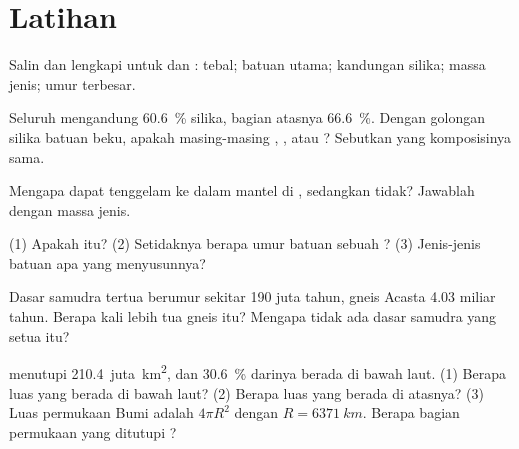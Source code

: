 \section{Latihan}

\begin{exercise}[$\star$]\label{exo:g12:continental-crust:1}
Salin dan lengkapi untuk  dan : tebal; batuan utama;
kandungan silika; massa jenis; umur terbesar.
\end{exercise}

\begin{exercise}[$\star$]\label{exo:g12:continental-crust:2}
Seluruh  mengandung \qty{60.6}{\percent} silika, bagian atasnya
\qty{66.6}{\percent}. Dengan golongan silika batuan beku, apakah masing-masing
, , atau ? Sebutkan  yang komposisinya
sama.
\end{exercise}

\begin{exercise}[$\star$]\label{exo:g12:continental-crust:3}
Mengapa  dapat tenggelam ke dalam mantel di ,
sedangkan  tidak? Jawablah dengan massa jenis.
\end{exercise}

\begin{exercise}[$\star$]\label{exo:g12:continental-crust:4}
(1) Apakah  itu? (2) Setidaknya berapa umur batuan sebuah ?
(3) Jenis-jenis batuan apa yang menyusunnya?
\end{exercise}

\begin{exercise}[$\star$]\label{exo:g12:continental-crust:5}
Dasar samudra tertua berumur sekitar 190 juta tahun, gneis Acasta 4.03 miliar
tahun. Berapa kali lebih tua gneis itu? Mengapa tidak ada dasar samudra yang
setua itu?
\end{exercise}

\begin{exercise}[$\star\star$]\label{exo:g12:continental-crust:6}
 menutupi \num{210.4}~juta~\unit{km^2}, dan \qty{30.6}{\percent}
darinya berada di bawah laut. (1) Berapa luas  yang berada di bawah
laut? (2) Berapa luas yang berada di atasnya? (3) Luas permukaan Bumi adalah
$4\pi R^2$ dengan $R = \qty{6371}{km}$. Berapa bagian permukaan yang ditutupi
?
\end{exercise}


